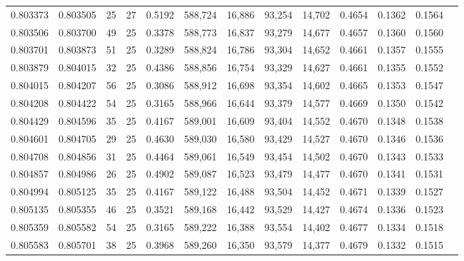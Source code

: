 \begin{tabular}{rrrrrrrrrrrrr}
0.803373 & 0.803505 &    25 &  27 &                                     0.5192 & 588,724 &  16,886 &  93,254 &  14,702 & 0.4654 & 0.1362 & 0.1564 \\
0.803506 & 0.803700 &    49 &  25 &                                     0.3378 & 588,773 &  16,837 &  93,279 &  14,677 & 0.4657 & 0.1360 & 0.1560 \\
0.803701 & 0.803873 &    51 &  25 &                                     0.3289 & 588,824 &  16,786 &  93,304 &  14,652 & 0.4661 & 0.1357 & 0.1555 \\
0.803879 & 0.804015 &    32 &  25 &                                     0.4386 & 588,856 &  16,754 &  93,329 &  14,627 & 0.4661 & 0.1355 & 0.1552 \\
0.804015 & 0.804207 &    56 &  25 &                                     0.3086 & 588,912 &  16,698 &  93,354 &  14,602 & 0.4665 & 0.1353 & 0.1547 \\
0.804208 & 0.804422 &    54 &  25 &                                     0.3165 & 588,966 &  16,644 &  93,379 &  14,577 & 0.4669 & 0.1350 & 0.1542 \\
0.804429 & 0.804596 &    35 &  25 &                                     0.4167 & 589,001 &  16,609 &  93,404 &  14,552 & 0.4670 & 0.1348 & 0.1538 \\
0.804601 & 0.804705 &    29 &  25 &                                     0.4630 & 589,030 &  16,580 &  93,429 &  14,527 & 0.4670 & 0.1346 & 0.1536 \\
0.804708 & 0.804856 &    31 &  25 &                                     0.4464 & 589,061 &  16,549 &  93,454 &  14,502 & 0.4670 & 0.1343 & 0.1533 \\
0.804857 & 0.804986 &    26 &  25 &                                     0.4902 & 589,087 &  16,523 &  93,479 &  14,477 & 0.4670 & 0.1341 & 0.1531 \\
0.804994 & 0.805125 &    35 &  25 &                                     0.4167 & 589,122 &  16,488 &  93,504 &  14,452 & 0.4671 & 0.1339 & 0.1527 \\
0.805135 & 0.805355 &    46 &  25 &                                     0.3521 & 589,168 &  16,442 &  93,529 &  14,427 & 0.4674 & 0.1336 & 0.1523 \\
0.805359 & 0.805582 &    54 &  25 &                                     0.3165 & 589,222 &  16,388 &  93,554 &  14,402 & 0.4677 & 0.1334 & 0.1518 \\
0.805583 & 0.805701 &    38 &  25 &                                     0.3968 & 589,260 &  16,350 &  93,579 &  14,377 & 0.4679 & 0.1332 & 0.1515 \\

\end{tabular}
